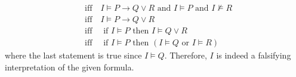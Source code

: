 \begin{exer}[1.1]
\begin{enumerate}[label=(\alph*)]
\begin{align*}
                    &\text{iff}\quad I \models P \rightarrow Q \lor R \text{ and } I \models P \text{ and } I \not\models R \\
                    &\text{iff}\quad I \models P \rightarrow Q \lor R \\
                    &\text{iff}\quad \text{ if } I \models P \text{ then } I \models Q \lor R \\
                    &\text{iff}\quad \text{ if } I \models P \text{ then } (I \models Q \text{ or } I \models R)
            \end{align*}
            where the last statement is true since $I \models Q$.
            Therefore, $I$ is indeed a falsifying interpretation of the given formula.
    \end{enumerate}
\end{exer}

